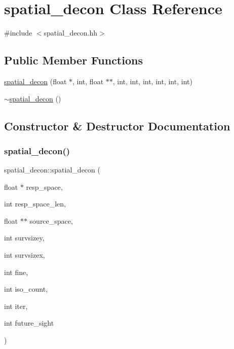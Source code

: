 \hypertarget{classspatial__decon}{}\section{spatial\+\_\+decon Class Reference}
\label{classspatial__decon}


{\ttfamily \#include $<$spatial\+\_\+decon.\+hh$>$}

\subsection*{Public Member Functions}
\begin{DoxyCompactItemize}
\item 
\mbox{\hyperlink{classspatial__decon_ac87a8698a9d10c5317aa21450afb0d5e}{spatial\+\_\+decon}} (float $\ast$, int, float $\ast$$\ast$, int, int, int, int, int, int)
\item 
\mbox{\hyperlink{classspatial__decon_afcb56f288ca1a562f1692ffd22b2e0c7}{$\sim$spatial\+\_\+decon}} ()
\end{DoxyCompactItemize}


\subsection{Constructor \& Destructor Documentation}
\mbox{\label{classspatial__decon_ac87a8698a9d10c5317aa21450afb0d5e}} 
\subsubsection{\texorpdfstring{spatial\+\_\+decon()}{spatial\_decon()}}
{\footnotesize\ttfamily spatial\+\_\+decon\+::spatial\+\_\+decon (\begin{DoxyParamCaption}\item[{float $\ast$}]{resp\+\_\+space,  }\item[{int}]{resp\+\_\+space\+\_\+len,  }\item[{float $\ast$$\ast$}]{source\+\_\+space,  }\item[{int}]{survsizey,  }\item[{int}]{survsizex,  }\item[{int}]{fine,  }\item[{int}]{iso\+\_\+count,  }\item[{int}]{iter,  }\item[{int}]{future\+\_\+sight }\end{DoxyParamCaption})}

